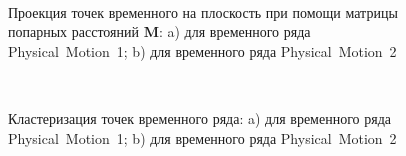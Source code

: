 \begin{figure}[h!t]\center
{}
\\
\caption{Проекция точек временного на плоскость при помощи матрицы попарных расстояний $\textbf{M}$: a) для временного ряда Physical~Motion~1; b) для временного ряда Physical~Motion~2}
\label{fig_real_2D}
\end{figure}

\begin{figure}[h!t]\center
{}
\\
\caption{Кластеризация точек временного ряда: 
a) для временного ряда Physical~Motion~1; b) для временного ряда Physical~Motion~2}
\label{fig_real_claster}
\end{figure}

